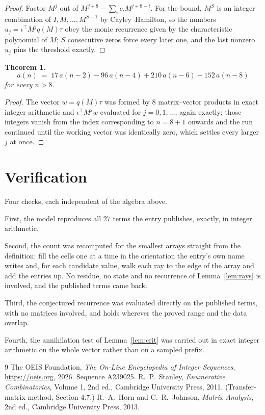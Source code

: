 \documentclass[11pt,a4paper]{article}
\theoremstyle{plain}
\newtheorem{theorem}{Theorem}
\theoremstyle{definition}
\begin{document}
\begin{proof}
Factor $M^{j}$ out of $M^{j+8}-\sum_ic_iM^{j+8-i}$. For the bound, $M^{S}$
is an integer combination of $I,M,\dots,M^{S-1}$ by Cayley--Hamilton, so the numbers
$u_j=\iota^{\!\top}M^{j}q(M)\tau$ obey the monic recurrence given by the characteristic
polynomial of $M$; $S$ consecutive zeros force every later one, and the last nonzero $u_j$
pins the threshold exactly.
\end{proof}

\begin{theorem}
\[
a(n)\;=\;17\,a(n-2) - 96\,a(n-4) + 210\,a(n-6) - 152\,a(n-8)
\]
for every $n>8$.
\end{theorem}

\begin{proof}
The vector $w=q(M)\tau$ was formed by $8$ matrix--vector products in exact integer
arithmetic and $\iota^{\!\top}M^{j}w$ evaluated for $j=0,1,\dots$, again exactly; those
integers vanish from the index corresponding to $n=8+1$ onwards and the run continued
until the working vector was identically zero, which settles every larger $j$ at once.
\end{proof}

\section{Verification}

Four checks, each independent of the algebra above.

First, the model reproduces all $27$ terms the entry publishes, exactly, in integer
arithmetic.

Second, the count was recomputed for the smallest arrays straight from the definition: fill the
cells one at a time in the orientation the entry's own name writes and, for each candidate
value, walk each ray to the edge of the array and add the entries up. No residue, no state and
no recurrence of Lemma~\ref{lem:rays} is involved, and the published terms came back.

Third, the conjectured recurrence was evaluated directly on the published terms, with no
matrices involved, and holds wherever the proved range and the data overlap.

Fourth, the annihilation test of Lemma~\ref{lem:crit} was carried out in exact integer
arithmetic on the whole vector rather than on a sampled prefix.

\begin{thebibliography}{9}
 The OEIS Foundation, \emph{The On-Line Encyclopedia of Integer
Sequences}, \url{https://oeis.org}, 2026. Sequence A239025.
 R.~P.~Stanley, \emph{Enumerative Combinatorics}, Volume 1, 2nd ed.,
Cambridge University Press, 2011. (Transfer-matrix method, Section 4.7.)
 R.~A.~Horn and C.~R.~Johnson, \emph{Matrix Analysis}, 2nd ed., Cambridge
University Press, 2013.
\end{thebibliography}
\end{document}
